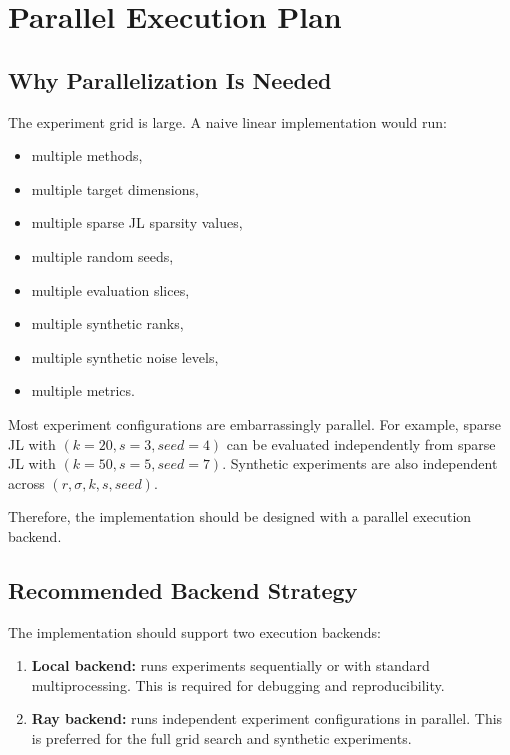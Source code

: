 \documentclass[11pt]{article}
\begin{document}
\section{Parallel Execution Plan}

\subsection{Why Parallelization Is Needed}

The experiment grid is large. A naive linear implementation would run:

\begin{itemize}
    \item multiple methods,
    \item multiple target dimensions,
    \item multiple sparse JL sparsity values,
    \item multiple random seeds,
    \item multiple evaluation slices,
    \item multiple synthetic ranks,
    \item multiple synthetic noise levels,
    \item multiple metrics.
\end{itemize}

Most experiment configurations are embarrassingly parallel. For example, sparse JL with $(k=20, s=3, seed=4)$ can be evaluated independently from sparse JL with $(k=50, s=5, seed=7)$. Synthetic experiments are also independent across $(r,\sigma,k,s,seed)$.

Therefore, the implementation should be designed with a parallel execution backend.

\subsection{Recommended Backend Strategy}

The implementation should support two execution backends:

\begin{enumerate}
    \item \textbf{Local backend:} runs experiments sequentially or with standard multiprocessing. This is required for debugging and reproducibility.

    \item \textbf{Ray backend:} runs independent experiment configurations in parallel. This is preferred for the full grid search and synthetic experiments.
\end{enumerate}
\end{document}

